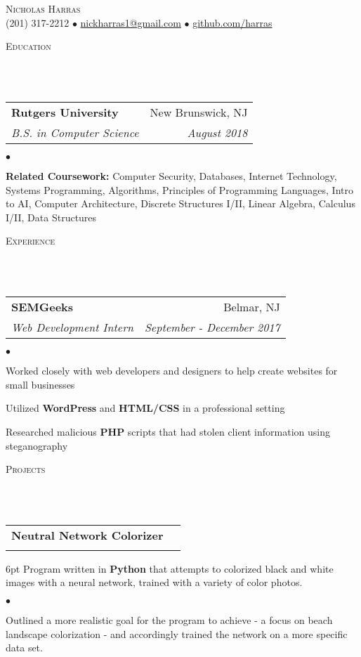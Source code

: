 \documentclass[12pt]{article}
\makeatletter
\newcommand{\lineunder}{
	\vspace*{-8pt} \\ 
	\hspace*{-18pt} 
	\hrulefill \\
}
\newcommand{\header}[1]{
	\vspace*{2pt}
	{\hspace*{-14pt}\vspace*{6pt} \textsc{#1}} 
	\vspace*{-6pt} 
	\lineunder
}
\newcommand{\contact}[2]{
	\vspace*{-8pt}
	\begin{center}
		{\LARGE \scshape {#1}}\\
		#2
	\end{center}
	\vspace*{-8pt}
}
\newenvironment{achievements}{
  \begin{list}{$\bullet$}{
  	\topsep 0pt \itemsep -4pt}}
  	{\vspace*{2pt}\end{list}
}
\newcommand{\mailto}[1]{
	\href{mailto:#1}{#1}}
\newcommand{\subheading}[4]{
 	\vspace{5pt}
    	\begin{tabular*}{1.01\textwidth}{l@{\extracolsep{\fill}}r}
      		\textbf{#1} & #2 \\
      		\textit{\small#3} & \textit{\small #4} \\
    	\end{tabular*}\vspace{-5pt}
}
\makeatother
\begin{document}
\small
\smallskip
\vspace*{-44pt}

\contact{Nicholas Harras}{(201) 317-2212 $\bullet$ \mailto{nickharras1@gmail.com} $\bullet$ \href{https://www.github.com/harras}{github.com/harras}}

\header{Education}

\subheading
	{Rutgers University}{New Brunswick, NJ}
	{B.S. in Computer Science}{August 2018}
	\begin{achievements}	
	\item{\bf Related Coursework:} Computer Security, Databases, Internet Technology, Systems Programming, Algorithms, Principles of Programming Languages, Intro to AI, Computer Architecture, Discrete Structures I/II, Linear Algebra, Calculus I/II, Data Structures
	\end{achievements}

\header{Experience}

\subheading
	{SEMGeeks}{Belmar, NJ}
	{Web Development Intern}{September - December 2017}
	\begin{achievements}
		\item Worked closely with web developers and designers to help create websites for small businesses
		\item Utilized \textbf{WordPress} and \textbf{HTML/CSS} in a professional setting
		\item Researched malicious \textbf{PHP} scripts that had stolen client information using steganography
	\end{achievements}


\header{Projects}

\subheading{Neutral Network Colorizer}{}{}{}
	\vspace{-15pt}
	\begin{adjustwidth}{6pt}{}
	Program written in \textbf{Python} that attempts to colorized black and white images with a neural network, trained with a variety of color photos.
	\end{adjustwidth}
	\begin{achievements}
		\item Outlined a more realistic goal for the program to achieve - a focus on beach landscape colorization - and accordingly trained the network on a more specific data set. 
	\end{achievements}
	
\end{document}
